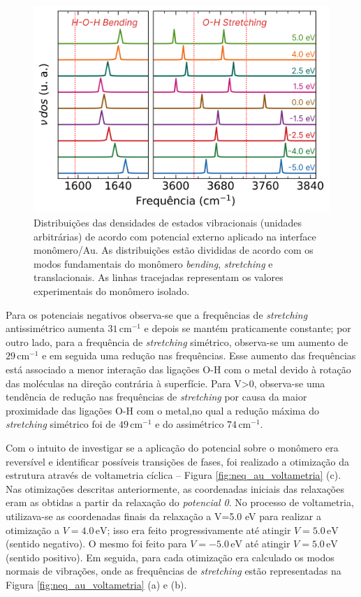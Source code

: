 \begin{figure}[h!]
	\centering
	\caption{Distribuições das densidades de estados vibracionais (unidades arbitrárias) de acordo com potencial externo aplicado na interface monômero/Au. As distribuições estão divididas de acordo com os modos fundamentais do monômero \textit{bending}, \textit{stretching} e translacionais. As linhas tracejadas representam os valores experimentais do monômero isolado.}
	\label{fig:neq_au_mon_freq}
	\includegraphics[scale=0.08]{figs/freq_monomer_au.png}
\end{figure}


Para os potenciais negativos observa-se que a frequências de \textit{stretching} antissimétrico aumenta $ 31\,\si{\cm}^{-1} $ e depois se mantém praticamente constante; por outro lado, para a frequência de \textit{stretching} simétrico, observa-se um aumento de $ 29\,\si{\cm}^{-1} $ e em seguida uma redução nas frequências. Esse aumento das frequências está associado a menor interação das ligações O-H com o metal devido à rotação das moléculas na direção contrária à superfície. Para V>0, observa-se uma tendência de redução nas frequências de \textit{stretching} por causa da maior proximidade das ligações O-H com o metal,no qual a redução máxima do \textit{stretching} simétrico foi de $ 49\,\si{\cm}^{-1} $ e do assimétrico $ 74\,\si{\cm}^{-1} $. 

Com o intuito de investigar se a aplicação do potencial sobre o monômero era reversível e identificar possíveis transições de fases, foi realizado a otimização da estrutura através de  voltametria cíclica -- Figura \ref{fig:neq_au_voltametria} (c). Nas otimizações descritas anteriormente, as coordenadas iniciais das relaxações eram as obtidas a partir da relaxação do \textit{potencial 0}. No processo de voltametria, utilizava-se as coordenadas finais da relaxação a V=5.0 eV para realizar a otimização a $ V=4.0\,\si{\eV}$; isso era feito progressivamente até atingir $ V=5.0\,\si{\eV}$ (sentido negativo). O mesmo foi feito para $ V=-5.0\,\si{\eV}$ até atingir $ V=5.0\,\si{\eV}$ (sentido positivo). Em seguida, para cada otimização era calculado os modos normais de vibrações, onde as frequências de \textit{stretching} estão representadas na Figura \ref{fig:neq_au_voltametria} (a) e (b). 

